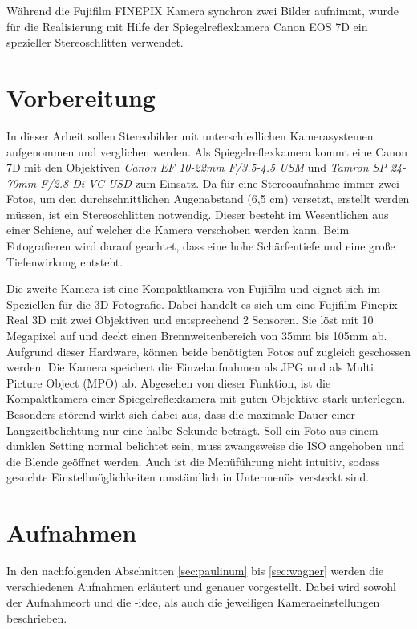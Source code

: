 \documentclass[liststotoc,bibtotoc,fontsize=14pt,]{scrreprt}
\begin{document}
	Während die Fujifilm FINEPIX Kamera synchron zwei Bilder aufnimmt, wurde für die Realisierung mit Hilfe der Spiegelreflexkamera Canon EOS 7D ein spezieller Stereoschlitten verwendet. 
	
	\chapter{Vorbereitung}
	In dieser Arbeit sollen Stereobilder mit unterschiedlichen Kamerasystemen aufgenommen und verglichen werden. Als Spiegelreflexkamera kommt eine Canon 7D mit den Objektiven \textit{Canon EF 10-22mm F/3.5-4.5 USM} und	\textit{Tamron SP 24-70mm F/2.8 Di VC USD} zum Einsatz. Da für eine Stereoaufnahme immer zwei Fotos, um den durchschnittlichen Augenabstand (6,5 cm) versetzt, erstellt werden müssen, ist ein Stereoschlitten notwendig. Dieser besteht im Wesentlichen aus einer Schiene, auf welcher die Kamera verschoben werden kann. Beim Fotografieren wird darauf geachtet, dass eine hohe Schärfentiefe und eine große Tiefenwirkung entsteht.
	
	Die zweite Kamera ist eine Kompaktkamera von Fujifilm und eignet sich im Speziellen für die 3D-Fotografie. Dabei handelt es sich um eine Fujifilm Finepix Real 3D mit zwei Objektiven und entsprechend 2 Sensoren. Sie löst mit 10 Megapixel auf und deckt einen Brennweitenbereich von 35mm bis 105mm ab. Aufgrund dieser Hardware, können beide benötigten Fotos auf zugleich geschossen werden. Die Kamera speichert die Einzelaufnahmen als JPG und als Multi Picture Object (MPO) ab. Abgesehen von dieser Funktion, ist die Kompaktkamera einer Spiegelreflexkamera mit guten Objektive stark unterlegen. Besonders störend wirkt sich dabei aus, dass die maximale Dauer einer Langzeitbelichtung nur eine halbe Sekunde beträgt. Soll ein Foto aus einem dunklen Setting normal belichtet sein, muss zwangsweise die ISO angehoben und die Blende geöffnet werden. Auch ist die Menüführung nicht intuitiv, sodass gesuchte Einstellmöglichkeiten umständlich in Untermenüs versteckt sind.
	
			
	\chapter{Aufnahmen}
	\label{ch:aufnahmen}
	In den nachfolgenden Abschnitten \ref{sec:paulinum} bis \ref{sec:wagner} werden die verschiedenen Aufnahmen erläutert und genauer vorgestellt. Dabei wird sowohl der Aufnahmeort und die -idee, als auch die jeweiligen Kameraeinstellungen beschrieben. 
	
\end{document}
